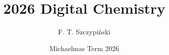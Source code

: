 \documentclass[11pt,twoside]{report}
\title{2026 Digital Chemistry}
\author{F. T. Szczypiński}
\date{Michaelmas Term 2026}
\begin{document}

\tableofcontents

\raggedbottom

% 









\printbibliography
\end{document}

